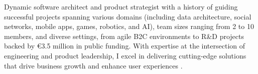 
\vspace{1ex}


\begin{cvparagraph}


Dynamic software architect and product strategist with a history of guiding successful projects spanning various domains (including data architecture, social networks, mobile apps, games, robotics, and AI), team sizes ranging from 2 to 10 members, and diverse settings, from agile B2C environments to R\&D projects backed by €3.5 million in public funding. With expertise at the intersection of engineering and product leadership, I excel in delivering cutting-edge solutions that drive business growth and enhance user experiences .

\end{cvparagraph}
